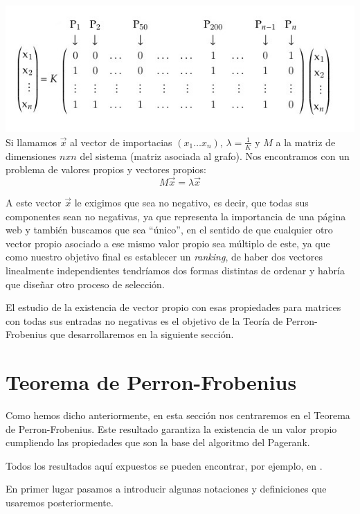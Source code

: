 \documentclass[size=a4, parskip=half, titlepage=false, toc=flat, toc=bib, 12pt]{scrartcl}
\theoremstyle{theorem-style}
\theoremstyle{definition-style}
\theoremstyle{remark-style}
\theoremstyle{example-style}
\theoremstyle{definition-style}
\theoremstyle{remark-style}
\begin{document}
\includegraphics[width=1.0\textwidth]{./img/matrizejemplo}
Si llamamos $\vec{x}$ al vector de importacias $(x_1 \dots x_n)$, $\lambda = \frac{1}{K}$ y
$M$ a la matriz de dimensiones $n x n$ del sistema (matriz asociada al grafo). Nos encontramos
con un problema de valores propios y vectores propios:
$$M \vec{x} = \lambda \vec{x} $$

A este vector $\vec{x}$ le exigimos que sea no negativo, es decir, que todas sus componentes sean no negativas, ya que representa la importancia de una página web y también buscamos que sea ``único'', en el sentido de que cualquier otro vector propio asociado a ese mismo valor propio sea múltiplo de este, ya que como nuestro objetivo final es establecer un \textit{ranking}, de haber dos vectores linealmente independientes tendríamos dos formas distintas de ordenar y habría que diseñar otro proceso de selección.

El estudio de la existencia de vector propio con esas propiedades para matrices con todas sus entradas no negativas es el objetivo de la Teoría de Perron-Frobenius que desarrollaremos en la siguiente sección.

\newpage

\section{Teorema de Perron-Frobenius}

Como hemos dicho anteriormente, en esta sección nos centraremos en el Teorema de Perron-Frobenius. Este resultado garantiza la existencia de un valor propio cumpliendo las propiedades que son la base del algoritmo del Pagerank.

Todos los resultados aquí expuestos se pueden encontrar, por ejemplo, en \cite{algebralineal}.

En primer lugar pasamos a introducir algunas notaciones y definiciones que usaremos posteriormente.
\end{document}

